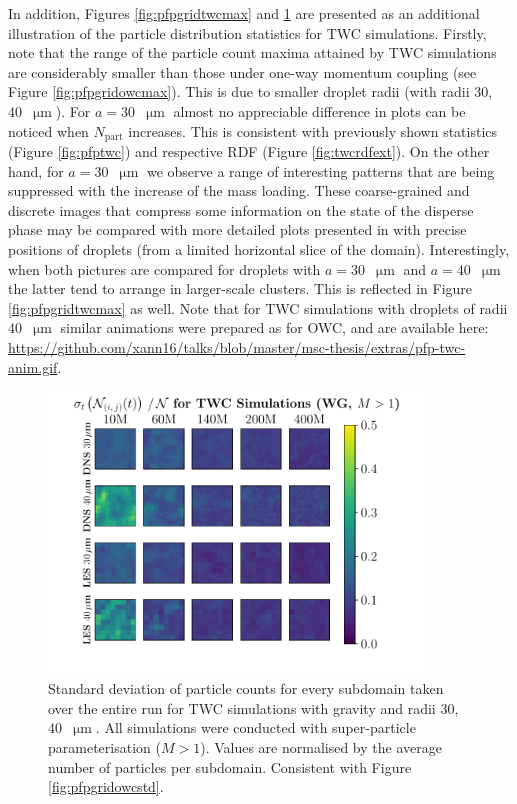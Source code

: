 \documentclass{pracamgren}
\begin{document}
\medskip

In addition, Figures \ref{fig:pfpgridtwcmax} and \ref{fig:pfpgridrdfstd} are presented as an additional illustration of the particle distribution statistics for TWC simulations.
Firstly, note that the range of the particle count maxima attained by TWC simulations are considerably smaller than those under one-way momentum coupling (see Figure \ref{fig:pfpgridowcmax}).
This is due to smaller droplet radii (with radii $30$,~$40$~$\upmu\text{m}$).
For $a = 30$~$\upmu\text{m}$ almost no appreciable difference in plots can be noticed when $N_{\text{part}}$ increases.
This is consistent with previously shown statistics (Figure \ref{fig:pfptwc}) and respective RDF (Figure \ref{fig:twcrdfext}).
On the other hand, for ${a = 30}$~$\upmu\text{m}$ we observe a range of interesting patterns that are being suppressed with the increase of the mass loading.
These coarse-grained and discrete images that compress some information on the state of the disperse phase may be compared with more detailed plots presented in \textcite[Figure 9bc]{Rosa2020} with precise positions of droplets (from a limited horizontal slice of the domain).
Interestingly, when both pictures are compared for droplets with ${a = 30}$~$\upmu\text{m}$ and ${a = 40}$~$\upmu\text{m}$ the latter tend to arrange in larger-scale clusters.
This is reflected in Figure \ref{fig:pfpgridtwcmax} as well.
Note that for TWC simulations with droplets of radii $40$~$\upmu\text{m}$ similar animations were prepared as for OWC, and are available here: \url{https://github.com/xann16/talks/blob/master/msc-thesis/extras/pfp-twc-anim.gif}.

\begin{figure}[h]
\centering
\includegraphics[width=10cm]{figures/3-24_pfpgridrdfstd.pdf}
\caption{
Standard deviation of particle counts for every subdomain taken over the entire run for TWC simulations with gravity and radii $30$, $40$~$\upmu\text{m}$.
All simulations were conducted with super-particle parameterisation ($M>1$). 
Values are normalised by the average number of particles per subdomain.
Consistent with Figure \ref{fig:pfpgridowcstd}.
}
\label{fig:pfpgridrdfstd}
\end{figure}
\end{document}

